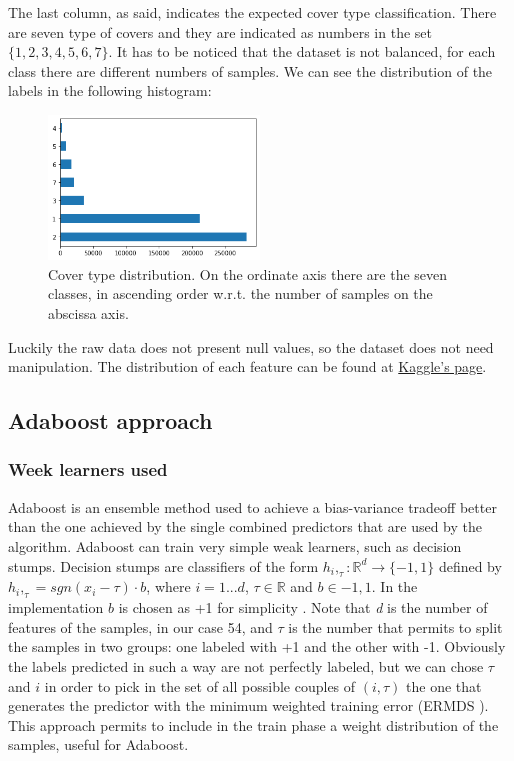 \documentclass{scrartcl}
\begin{document}
The last column, as said, indicates the expected cover type classification. There are seven type of covers and they are indicated as numbers in the set $\{1, 2, 3, 4, 5, 6, 7\}$. It has to be noticed that the dataset is not balanced, for each class there are different numbers of samples. We can see the distribution of the labels in the following histogram: 
\begin{figure}[h!]
  \includegraphics[width=0.5\textwidth]{imgs/cover_type_distribution.png}
  \centering
  \caption{Cover type distribution. On the ordinate axis there are the seven classes, in ascending order w.r.t. the number of samples on the abscissa axis.}
  \label{figure:distribution}
\end{figure}

Luckily the raw data does not present null values, so the dataset does not need manipulation. The distribution of each feature can be found at \href{https://www.kaggle.com/uciml/forest-cover-type-dataset}{Kaggle's page}.

\subsection{Adaboost approach}
\subsubsection{Week learners used}
Adaboost is an ensemble method used to achieve a bias-variance tradeoff better than the one achieved by the single combined predictors that are used by the algorithm. Adaboost can train very simple weak learners, such as decision stumps. Decision stumps are classifiers of the form $h_i,_\tau : \mathbb{R}^d \to \{-1,1\}$ defined by $h_i,_\tau = sgn(x_i - \tau) \cdot b$, where $i=1...d$, $\tau \in \mathbb{R}$ and $b\in{-1,1}$. In the implementation $b$ is chosen as +1 for simplicity \cite{boosting-notes}. Note that \textit{d} is the number of features of the samples, in our case 54, and $\tau$ is the number that permits to split the samples in two groups: one labeled with +1 and the other with -1. Obviously the labels predicted in such a way are not perfectly labeled, but we can chose $\tau$ and $i$ in order to pick in the set of all possible couples of $(i, \tau)$ the one that generates the predictor with the minimum weighted training error (ERMDS \cite{ermds}). This approach permits to include in the train phase a weight distribution of the samples, useful for Adaboost.
\end{document}
